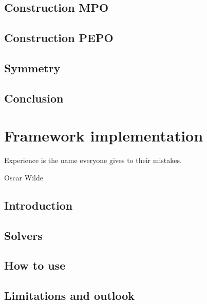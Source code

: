 \documentclass{book}
\newcounter{a}
\newcounter{b}
\begin{document}
\section{Construction MPO}\label{H4_mpo_cons}


\section{Construction PEPO}\label{H4_pepo_cons}


\section{Symmetry}\label{sec:symm}


\section{Conclusion}


\chapter{Framework implementation}\label{chap5}



\epigraph{Experience is the name everyone gives to their mistakes.}{Oscar Wilde}

\section{Introduction}


\section{Solvers} \label{sec:framework_impl}


\section{How to use}\label{sec:H5:source_code}


\section{Limitations and outlook}

\end{document}
